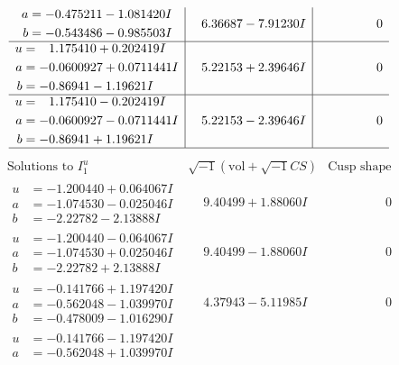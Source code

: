 \documentclass[1p]{elsarticle_modified}
\theoremstyle{definition}
\newcommand{\I}{\sqrt{-1}}
\begin{document}
$$\begin{array}{c|c|c}
\begin{aligned}
a &= -0.475211 - 1.081420 I \\
b &= -0.543486 - 0.985503 I\end{aligned}
 & \phantom{-}6.36687 - 7.91230 I & \phantom{-0.000000 } 0 \\ \hline\begin{aligned}
u &= \phantom{-}1.175410 + 0.202419 I \\
a &= -0.0600927 + 0.0711441 I \\
b &= -0.86941 - 1.19621 I\end{aligned}
 & \phantom{-}5.22153 + 2.39646 I & \phantom{-0.000000 } 0 \\ \hline\begin{aligned}
u &= \phantom{-}1.175410 - 0.202419 I \\
a &= -0.0600927 - 0.0711441 I \\
b &= -0.86941 + 1.19621 I\end{aligned}
 & \phantom{-}5.22153 - 2.39646 I & \phantom{-0.000000 } 0\\
 \hline 
 \end{array}$$\newpage$$\begin{array}{c|c|c}  
\text{Solutions to }I^u_{1}& \I (\text{vol} + \sqrt{-1}CS) & \text{Cusp shape}\\
 \hline 
\begin{aligned}
u &= -1.200440 + 0.064067 I \\
a &= -1.074530 - 0.025046 I \\
b &= -2.22782 - 2.13888 I\end{aligned}
 & \phantom{-}9.40499 + 1.88060 I & \phantom{-0.000000 } 0 \\ \hline\begin{aligned}
u &= -1.200440 - 0.064067 I \\
a &= -1.074530 + 0.025046 I \\
b &= -2.22782 + 2.13888 I\end{aligned}
 & \phantom{-}9.40499 - 1.88060 I & \phantom{-0.000000 } 0 \\ \hline\begin{aligned}
u &= -0.141766 + 1.197420 I \\
a &= -0.562048 - 1.039970 I \\
b &= -0.478009 - 1.016290 I\end{aligned}
 & \phantom{-}4.37943 - 5.11985 I & \phantom{-0.000000 } 0 \\ \hline\begin{aligned}
u &= -0.141766 - 1.197420 I \\
a &= -0.562048 + 1.039970 I \\

\end{aligned}
\end{array}$$
\end{document}

